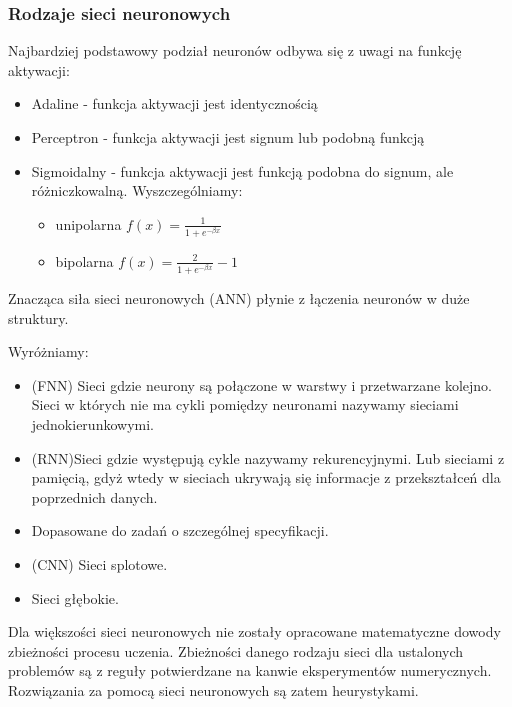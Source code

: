 \documentclass[10pt,a4paper]{book}
\begin{document}
\subsubsection{Rodzaje sieci neuronowych}

Najbardziej podstawowy podział neuronów odbywa się z uwagi na funkcję aktywacji:
\begin{itemize}
\item Adaline - funkcja aktywacji jest identycznością
\item Perceptron - funkcja aktywacji jest signum lub podobną funkcją
\item Sigmoidalny - funkcja aktywacji jest funkcją podobna do signum, ale różniczkowalną. Wyszczególniamy:
\begin{itemize}
\item unipolarna $ f(x) = \frac{1}{1+e^{-\beta x}}$
\item bipolarna $ f(x) = \frac{2}{1+e^{-\beta x}} -1$
\end{itemize}
\end{itemize}

Znacząca siła sieci neuronowych (ANN) płynie z łączenia neuronów w duże struktury.

Wyróżniamy:
\begin{itemize}
\item (FNN) Sieci gdzie neurony są połączone w warstwy i przetwarzane kolejno. Sieci w których nie ma cykli pomiędzy neuronami nazywamy sieciami jednokierunkowymi.
\item (RNN)Sieci gdzie występują cykle nazywamy rekurencyjnymi. Lub sieciami z pamięcią, gdyż wtedy w sieciach ukrywają się informacje z przekształceń dla poprzednich danych.
\item Dopasowane do zadań o szczególnej specyfikacji.
\item (CNN) Sieci splotowe.
\item Sieci głębokie.
\end{itemize}

\begin{remark*}
Dla większości sieci neuronowych nie zostały opracowane matematyczne dowody zbieżności procesu uczenia. Zbieżności danego rodzaju sieci dla ustalonych problemów są z reguły potwierdzane na kanwie eksperymentów numerycznych. Rozwiązania za pomocą sieci neuronowych są zatem heurystykami.
\end{remark*}
\end{document}
